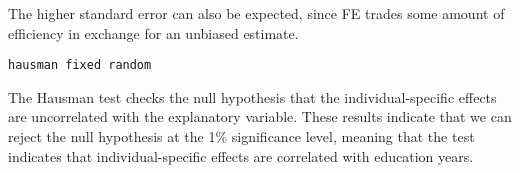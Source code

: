The higher standard error can also be expected, since FE trades some amount of efficiency in exchange for an unbiased estimate.


\begin{verbatim}
hausman fixed random
\end{verbatim}


The Hausman test checks the null hypothesis that the individual-specific effects are uncorrelated with the explanatory variable. These results indicate that we can reject the null hypothesis at the 1\% significance level, meaning that the test indicates that individual-specific effects are correlated with education years.